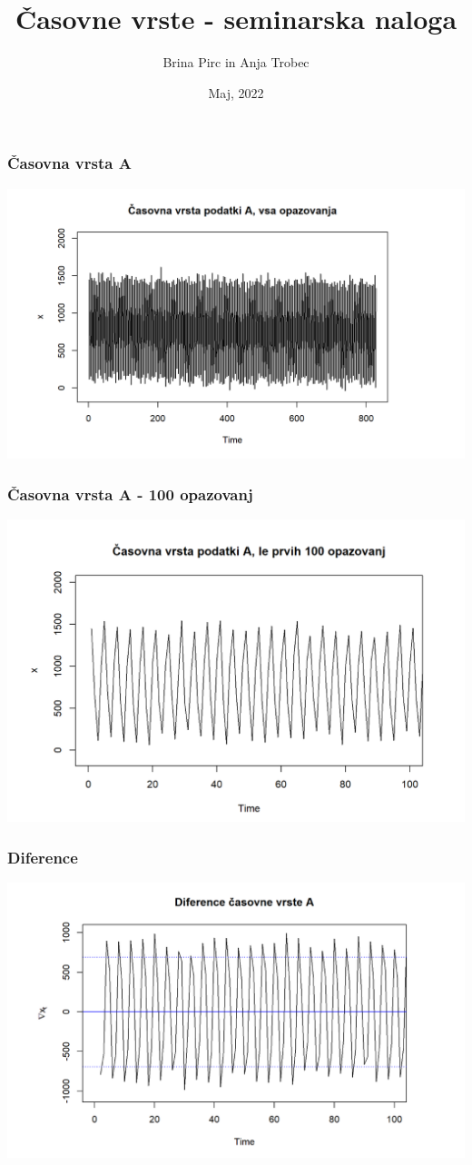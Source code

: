 \documentclass[10pt]{beamer}
\title{Časovne vrste - seminarska naloga}
\author{\centering Brina Pirc in Anja Trobec}
\institute{\centering Fakulteta za Matematiko in Fiziko}
\date{\centering Maj, 2022}
\begin{document}
\frame{\titlepage}

\begin{frame}
\frametitle{Časovna vrsta A}
\includegraphics[width=1\textwidth]{casovnaA.png}
\end{frame}


\begin{frame}
\frametitle{Časovna vrsta A - 100 opazovanj}
\includegraphics[width=1\textwidth]{casovnaA100.png}
\end{frame}

\begin{frame}
\frametitle{Diference}
\includegraphics[width=1\textwidth]{diff_A.png}
\end{frame}
\end{document}
